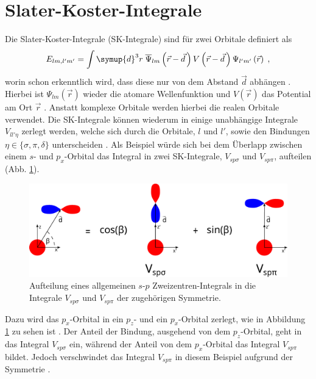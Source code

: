 \section{Slater-Koster-Integrale}
\label{sec:theo_SK}
Die Slater-Koster-Integrale (SK-Integrale) sind für zwei Orbitale definiert als
\begin{equation}
    E_{lm,l'm'} = \int \symup{d}^3r \; \overline{\Psi}_{lm} \left (\vec{r}-\vec{d} \, \right )
    V \left ( \vec{r} - \vec{d} \, \right ) \Psi_{l'm'} \left (\vec{r} \right ) \; , \label{eqn:SK}
\end{equation}
worin schon erkenntlich wird, dass diese nur von dem Abstand $\vec{d}$ abhängen \cite{SC_literature}.
Hierbei ist $\Psi_{lm}(\vec{r})$ wieder die atomare Wellenfunktion und $V(\vec{r})$ das Potential am Ort $\vec{r}$ \cite{SC_literature}.
Anstatt komplexe Orbitale werden hierbei die realen Orbitale verwendet.
Die SK-Integrale können wiederum in einige unabhängige Integrale $V_{ll'\eta}$ zerlegt werden, welche sich durch die Orbitale, $l$ und $l'$, 
sowie den Bindungen $\eta \in \{\sigma ,\pi, \delta \}$ unterscheiden \cite{electronic_structure}.
Als Beispiel würde sich bei dem Überlapp zwischen einem $s$- und $p_x$-Orbital das Integral in zwei 
SK-Integrale, $V_{sp\sigma}$ und $V_{sp\pi}$, aufteilen (Abb. \ref{fig:TC}).
\begin{figure}
    \centering
    \includegraphics[width = \textwidth]{Plots/SK.pdf}
    \caption{Aufteilung eines allgemeinen $s$-$p$ Zweizentren-Integrals in die Integrale $V_{sp\sigma}$ und $V_{sp\pi}$ der zugehörigen Symmetrie.}
    \label{fig:TC}
\end{figure}
Dazu wird das $p_x$-Orbital in ein $p_z$- und ein $p_x$-Orbital zerlegt, wie in Abbildung \ref{fig:TC} zu sehen ist \cite{SC_literature, electronic_structure}.
Der Anteil der Bindung, ausgehend von dem $p_z$-Orbital, geht in das Integral $V_{sp\sigma}$ ein, während 
der Anteil von dem $p_x$-Orbital das Integral $V_{sp\pi}$ bildet.
Jedoch verschwindet das Integral $V_{sp\pi}$ in diesem Beispiel aufgrund der Symmetrie \cite{SC_literature}.
